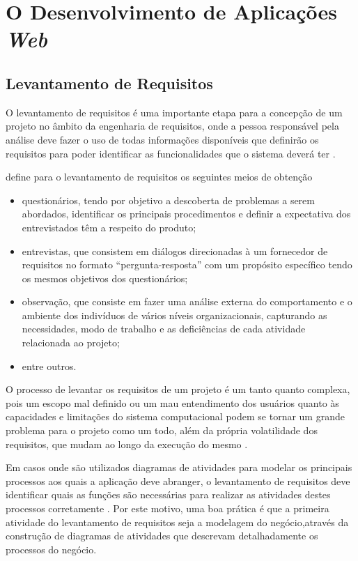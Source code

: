 \chapter{O Desenvolvimento de Aplicações \textit{Web}}
\label{c:o_desenvolvimento_de_aplicacoes_web}
\section{Levantamento de Requisitos}

O levantamento de requisitos é uma importante etapa para a concepção de um projeto no âmbito da engenharia de requisitos, onde a pessoa responsável pela análise deve fazer o uso de todas informações disponíveis que definirão os requisitos para poder identificar as funcionalidades que o sistema deverá ter \cite{wazlawick2013engenharia}.

\cite{bezerra2016principios} define para o levantamento de requisitos os seguintes meios de obtenção 
\begin{itemize}
    \item questionários, tendo por objetivo a descoberta de problemas a serem abordados, identificar os principais procedimentos e definir a expectativa dos entrevistados têm a respeito do produto;
    \item entrevistas, que consistem em diálogos direcionadas à um fornecedor de requisitos no formato “pergunta-resposta” com um propósito específico tendo os mesmos objetivos dos questionários;
    \item observação, que consiste em fazer uma análise externa do comportamento e o ambiente dos indivíduos de vários níveis organizacionais, capturando as necessidades, modo de trabalho e as deficiências de cada atividade relacionada ao projeto; 
    \item entre outros.
\end{itemize}

O processo de levantar os requisitos de um projeto é um tanto quanto complexa, pois um escopo mal definido ou um mau entendimento dos usuários quanto às capacidades e limitações do sistema computacional  podem se tornar um grande problema para o projeto como um todo, além da própria volatilidade dos requisitos, que mudam ao longo da execução do mesmo \cite{pressman2016engenharia}.

Em casos onde são utilizados diagramas de atividades para modelar os principais processos aos quais a aplicação deve abranger, o levantamento de requisitos deve identificar quais as funções são necessárias para realizar as atividades destes processos corretamente \cite{wazlawick2013engenharia}. Por este motivo, uma boa prática é que a primeira atividade do levantamento de requisitos seja a modelagem do negócio,através da construção de diagramas de atividades que descrevam detalhadamente os processos do negócio.

